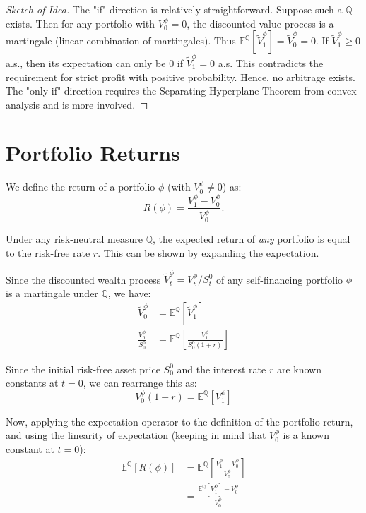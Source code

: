 \begin{proof}[Sketch of Idea]
The "if" direction is relatively straightforward. Suppose such a $\mathbb{Q}$ exists. Then for any portfolio with $V_0^\phi = 0$, the discounted value process is a martingale (linear combination of martingales).
Thus $\mathbb{E}^\mathbb{Q}[\tilde{V}_1^\phi] = \tilde{V}_0^\phi = 0$.
If $\tilde{V}_1^\phi \ge 0$ a.s., then its expectation can only be 0 if $\tilde{V}_1^\phi = 0$ a.s. This contradicts the requirement for strict profit with positive probability. Hence, no arbitrage exists.
The "only if" direction requires the Separating Hyperplane Theorem from convex analysis and is more involved.
\end{proof}

\section{Portfolio Returns}

We define the return of a portfolio $\phi$ (with $V_0^\phi \ne 0$) as:
\begin{equation}
    R(\phi) = \frac{V_1^\phi - V_0^\phi}{V_0^\phi}.
\end{equation}

Under any risk-neutral measure $\mathbb{Q}$, the expected return of \textit{any} portfolio is equal to the risk-free rate $r$. This can be shown by expanding the expectation. 

Since the discounted wealth process $\tilde{V}_t^\phi = V_t^\phi / S_t^0$ of any self-financing portfolio $\phi$ is a martingale under $\mathbb{Q}$, we have:
\begin{align}
    \tilde{V}_0^\phi &= \mathbb{E}^\mathbb{Q}[\tilde{V}_1^\phi] \\
    \frac{V_0^\phi}{S_0^0} &= \mathbb{E}^\mathbb{Q}\left[ \frac{V_1^\phi}{S_0^0(1+r)} \right]
\end{align}

Since the initial risk-free asset price $S_0^0$ and the interest rate $r$ are known constants at $t=0$, we can rearrange this as:
\begin{equation}
    V_0^\phi(1+r) = \mathbb{E}^\mathbb{Q}[V_1^\phi]
\end{equation}

Now, applying the expectation operator to the definition of the portfolio return, and using the linearity of expectation (keeping in mind that $V_0^\phi$ is a known constant at $t=0$):
\begin{align}
    \mathbb{E}^\mathbb{Q}[R(\phi)] &= \mathbb{E}^\mathbb{Q}\left[ \frac{V_1^\phi - V_0^\phi}{V_0^\phi} \right] \\
    &= \frac{\mathbb{E}^\mathbb{Q}[V_1^\phi] - V_0^\phi}{V_0^\phi}
\end{align}


